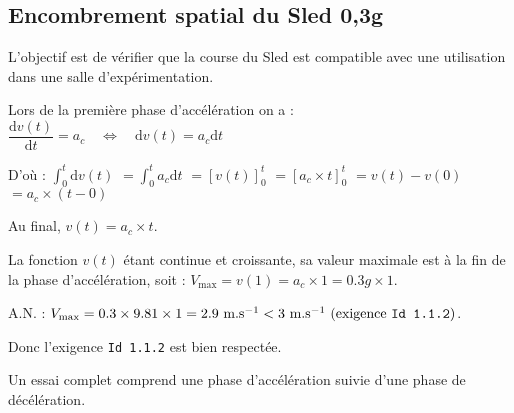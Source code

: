 \subsection{Encombrement spatial du Sled 0,3g \label{ccs_mp_2022_sec_2A}}

\begin{obj}
L'objectif est de vérifier que la course du Sled est compatible avec une utilisation dans une salle d'expérimentation.
\end{obj}
\fi


\ifprof
\begin{corrige}
Lors de la première phase d'accélération on a : $ \dfrac{\text{d}v(t)}{\text{d}t} = a_c \quad \Leftrightarrow \quad \text{d} v(t) = a_c \text{d}t$

D'où : 
$\int_0^t  \text{d} v(t) $ 
$= \int_0^t a_c \text{d}t $
$ = \left[ v(t) \right]_0^t $
$ = \left[ a_c \times t \right]_0^t $
$ = v(t) - v(0) $
$= a_c \times (t - 0) $

Au final, $v(t)  = a_c \times t$.

\end{corrige}
\else
\fi

\ifprof
\begin{corrige}
La fonction $v(t)$ étant continue et croissante, sa valeur maximale est à la fin de la phase d'accélération, soit : $ V_\text{max} = v(1) = a_c \times 1 = 0.3 g \times 1$.

A.N. : $ V_\text{max} = 0.3 \times 9.81 \times 1 = 2.9 \text{ m.s}^{-1} < 3 \text{ m.s}^{-1} \text{  (exigence \texttt{Id 1.1.2})}$.

Donc l'exigence \texttt{Id 1.1.2} est bien respectée.
\end{corrige}
\else
\fi


Un essai complet comprend une phase d'accélération suivie d'une phase de décélération.

